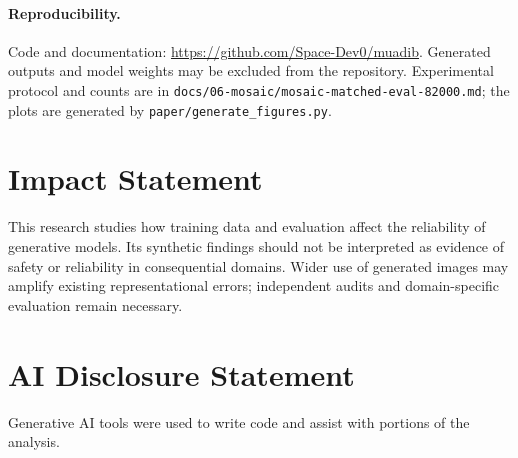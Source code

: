 \documentclass{article}
\begin{document}
\paragraph{Reproducibility.} Code and documentation: \url{https://github.com/Space-Dev0/muadib}. Generated outputs and model weights may be excluded from the repository. Experimental protocol and counts are in \texttt{docs/06-mosaic/mosaic-matched-eval-82000.md}; the plots are generated by \texttt{paper/generate\_figures.py}.
\fi
\section*{Impact Statement}
This research studies how training data and evaluation affect the reliability of generative models. Its synthetic findings should not be interpreted as evidence of safety or reliability in consequential domains. Wider use of generated images may amplify existing representational errors; independent audits and domain-specific evaluation remain necessary.
\section*{AI Disclosure Statement}
Generative AI tools were used to write code and assist with portions of the analysis.


\end{document}
